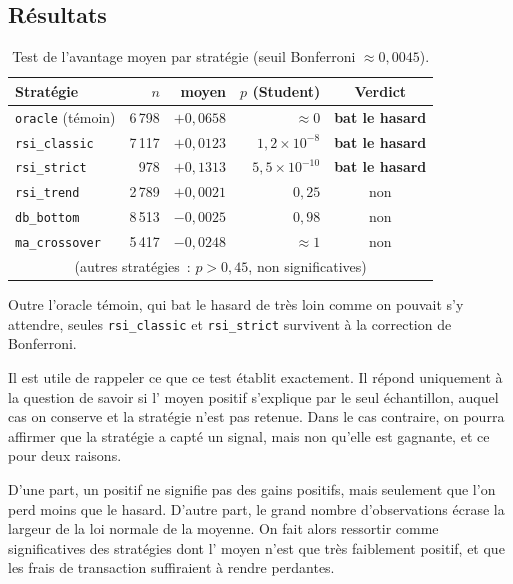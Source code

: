 \subsection{Résultats}
\begin{table}[H]
\centering
\caption{Test de l'avantage moyen par stratégie (seuil Bonferroni $\approx 0{,}0045$).}
\label{tab:b1-etape1}
\small
\begin{tabular}{@{}lrrrc@{}}
\toprule
Stratégie & $n$ & \edgevar{} moyen & $p$ (Student) & Verdict \\
\midrule
\texttt{oracle} (témoin) & 6\,798 & $+0{,}0658$ & $\approx 0$    & \textbf{bat le hasard} \\
\midrule
\texttt{rsi\_classic} & 7\,117 & $+0{,}0123$ & $1{,}2\times10^{-8}$  & \textbf{bat le hasard} \\
\texttt{rsi\_strict}  &   978  & $+0{,}1313$ & $5{,}5\times10^{-10}$ & \textbf{bat le hasard} \\
\texttt{rsi\_trend}   & 2\,789 & $+0{,}0021$ & $0{,}25$             & non \\
\texttt{db\_bottom}   & 8\,513 & $-0{,}0025$ & $0{,}98$             & non \\
\texttt{ma\_crossover}& 5\,417 & $-0{,}0248$ & $\approx 1$          & non \\
\multicolumn{5}{c}{\footnotesize (autres stratégies~: $p>0{,}45$, non significatives)} \\
\bottomrule
\end{tabular}
\end{table}

Outre l'oracle témoin, qui bat le hasard de très loin comme on pouvait s'y
attendre, seules \texttt{rsi\_classic} et \texttt{rsi\_strict} survivent à la
correction de Bonferroni.

Il est utile de rappeler ce que ce test établit exactement. Il répond
uniquement à la question de savoir si l'\edgevar{} moyen positif s'explique
par le seul échantillon, auquel cas on conserve \Hzero{} et la stratégie n'est
pas retenue. Dans le cas contraire, on pourra affirmer que la stratégie a
capté un signal, mais non qu'elle est gagnante, et ce pour deux raisons.

D'une part, un \edgevar{} positif ne signifie pas des gains positifs, mais
seulement que l'on perd moins que le hasard. D'autre part, le grand nombre
d'observations écrase la largeur de la loi normale de la moyenne. On fait
alors ressortir comme significatives des stratégies dont l'\edgevar{} moyen
n'est que très faiblement positif, et que les frais de transaction
suffiraient à rendre perdantes.




